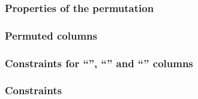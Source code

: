 \subsubsection{Properties of the permutation}                                                               \label{hub: consistencies: storage: permutation}        
\subsubsection{Permuted columns                                                             \lispDone{}}    \label{hub: consistencies: storage: columns}            
\subsubsection{Constraints for ``'', ``'' and ``'' columns \lispDone{}}    \label{hub: consistencies: storage: permutation}        
\subsubsection{Constraints                                                                  \lispDone{}}    \label{hub: consistencies: storage: constraints}        
